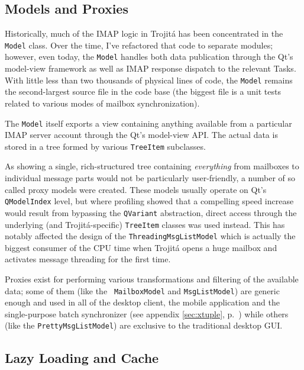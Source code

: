 \documentclass[trojita]{subfiles}
\begin{document}
\subsection{Models and Proxies}

Historically, much of the IMAP logic in Trojitá has been concentrated in the {\tt Model} class.  Over the time, I've
refactored that code to separate modules; however, even today, the {\tt Model} handles both data publication through the
Qt's model-view framework as well as IMAP response dispatch to the relevant Tasks.  With little less than two thousands
of physical lines of code, the {\tt Model} remains the second-largest source file in the code base (the biggest file is
a unit tests related to various modes of mailbox synchronization).

The {\tt Model} itself exports a view containing anything available from a particular IMAP server account through the
Qt's model-view API.  The actual data is stored in a tree formed by various {\tt TreeItem} subclasses.

As showing a single, rich-structured tree containing {\em everything} from mailboxes to individual message parts would
not be particularly user-friendly, a number of so called proxy models were created.  These models usually operate on
Qt's {\tt QModelIndex} level, but where profiling showed that a compelling speed increase would result from bypassing
the {\tt QVariant} abstraction, direct access through the underlying (and Trojitá-specific) {\tt TreeItem} classes was
used instead.  This has notably affected the design of the {\tt ThreadingMsgListModel} which is actually the biggest
consumer of the CPU time when Trojitá opens a huge mailbox and activates message threading for the first time.

Proxies exist for performing various transformations and filtering of the available data; some of them (like the {\tt
MailboxModel} and {\tt MsgListModel}) are generic enough and used in all of the desktop client, the mobile application
and the single-purpose batch synchronizer (see appendix \ref{sec:xtuple}, p.~\pageref{sec:xtuple}) while others (like
the {\tt PrettyMsgListModel}) are exclusive to the traditional desktop GUI.

\subsection{Lazy Loading and Cache}
\end{document}
